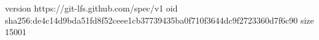version https://git-lfs.github.com/spec/v1
oid sha256:de4c14d9bda51fd8f52ceee1cb37739435ba0f710f3644dc9f2723360d7f6c90
size 15001
